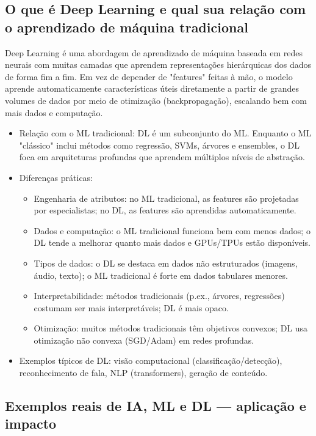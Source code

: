 \documentclass[a4paper,12pt]{article}
\begin{document}
\subsection{O que é Deep Learning e qual sua relação com o aprendizado de máquina tradicional \cite{goodfellow2016}}

Deep Learning é uma abordagem de aprendizado de máquina baseada em redes neurais com muitas camadas que aprendem representações hierárquicas dos dados de forma fim a fim. Em vez de depender de "features" feitas à mão, o modelo aprende automaticamente características úteis diretamente a partir de grandes volumes de dados por meio de otimização (backpropagação), escalando bem com mais dados e computação.

\begin{itemize}
\item Relação com o ML tradicional: DL é um subconjunto do ML. Enquanto o ML "clássico" inclui métodos como regressão, SVMs, árvores e ensembles, o DL foca em arquiteturas profundas que aprendem múltiplos níveis de abstração.
\item Diferenças práticas:
  \begin{itemize}
  \item Engenharia de atributos: no ML tradicional, as features são projetadas por especialistas; no DL, as features são aprendidas automaticamente.
  \item Dados e computação: o ML tradicional funciona bem com menos dados; o DL tende a melhorar quanto mais dados e GPUs/TPUs estão disponíveis.
  \item Tipos de dados: o DL se destaca em dados não estruturados (imagens, áudio, texto); o ML tradicional é forte em dados tabulares menores.
  \item Interpretabilidade: métodos tradicionais (p.ex., árvores, regressões) costumam ser mais interpretáveis; DL é mais opaco.
  \item Otimização: muitos métodos tradicionais têm objetivos convexos; DL usa otimização não convexa (SGD/Adam) em redes profundas.
  \end{itemize}
\item Exemplos típicos de DL: visão computacional (classificação/detecção), reconhecimento de fala, NLP (transformers), geração de conteúdo.
\end{itemize}

\subsection{Exemplos reais de IA, ML e DL — aplicação e impacto}
\end{document}
